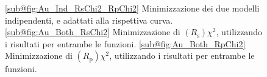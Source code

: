 \documentclass[
    prb,altaffilletter,citeautoscript,
    amsmath,amssymb,
    showpacs,showkeys,floatfix,
    reprint
]{revtex4-1}
\begin{document}


\appendix

\begin{figure}
    \centering
    
    
    \caption{\ref{sub@fig:Au_Ind_RsChi2_RpChi2} Minimizzazione dei due modelli indipendenti, e adattati alla rispettiva curva. \ref{sub@fig:Au_Both_RsChi2} Minimizzazione di $(R_\mathrm{s})\chi^2$, utilizzando i risultati per entrambe le funzioni. \ref{sub@fig:Au_Both_RpChi2} Minimizzazione di $(R_\mathrm{p})\chi^2$, utilizzando i risultati per entrambe le funzioni.}
\end{figure}
\end{document}
